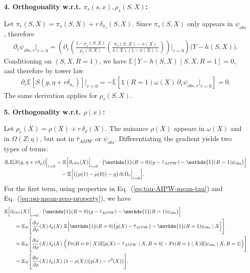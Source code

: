 \documentclass{article}
\theoremstyle{plain}
\theoremstyle{definition}
\theoremstyle{remark}
\newcommand{\E}{\mathbb{E}}                %
\newcommand{\1}{\mathds{1}}                %
\begin{document}
\textbf{4. Orthogonality w.r.t. $\pi_s(s,x), \rho_s(S,X)$:}

Let $\pi_r(S,X)=\pi_s(S,X)+r\,\delta_{\pi_s}(S,X)$. Since $\pi_s(S,X)$ only appears in $\psi_{obs}$, therefore
\begin{align}
\partial_r\psi_{obs,r}\Big|_{r=0}
=\left(\partial_r (\frac{1-\rho_s(S,X)}{\rho_s(S,X)} \left( \frac{\pi_s(S,X) - \pi(X)}{\pi(X)(1-\pi(X))} \right))\Big|_{r=0}\right)\big(Y-h(S,X)\big).
\end{align}
Conditioning on $(S,X,R=1)$, we have $\E[Y-h(S,X)\mid S,X,R=1]=0$, and therefore by tower law
\begin{align}
\partial_r \E[S(g,\eta+r\delta_{\pi_s})]\Big|_{r=0} = -\E\left[\1(R=1)\omega(X)\,\partial_r\psi_{obs,r}\Big|_{r=0}\right]=0.
\end{align}
The same derivation applies for $\rho_s(S,X)$.

\textbf{5. Orthogonality w.r.t. $\rho(x)$:}

Let $\rho_r(X)=\rho(X)+r\,\delta_\rho(X)$. The nuisance $\rho(X)$ appears in $\omega(X)$ and in $\Omega(Z;\eta)$, but not in $\hat\tau_{AIPW}$ or $\psi_{obs}$.
Differentiating the gradient yields two types of terms:
\begin{align}
\partial_r \E[S(g,\eta+r\delta_\rho)]\Big|_{r=0}
&=
\E\Big[\partial_r\omega_r(X)\Big|_{r=0}\cdot\big(\1(R=0)(g-\hat\tau_{AIPW})-\1(R=1)\psi_{obs}\big)\Big] \notag\\
&\quad
-\E\Big[\big((\mu(1)-\mu(0))-g\big)\,\partial_r\Omega_r\Big|_{r=0}\Big].
\label{eq:rho-derivative-decomp}
\end{align}
For the first term, using properties in Eq.~(\ref{eq:tau-AIPW-mean-tau}) and Eq.~(\ref{eq:psi-mean-zero-property}), we have
\begin{align}
&\E\Big[\partial_r\omega_r(X)\Big|_{r=0}\cdot\big(\1(R=0)(g-\hat\tau_{AIPW})-\1(R=1)\psi_{obs}\big)\Big] \notag\\
&\qquad=
\E_X\Bigg[
\frac{\partial\omega}{\partial\rho}(X)\,\delta_\rho(X)\;
\E\Big[\1(R=0)\big(g(X)-\hat\tau_{AIPW}\big)-\1(R=1)\psi_{obs} \mid X\Big]
\Bigg] \notag\\
&\qquad=
\E_X\Bigg[
\frac{\partial\omega}{\partial\rho}(X)\,\delta_\rho(X)\;
\Big(
\Pr(R=0\mid X)\E[g(X)-\hat\tau_{AIPW}\mid X,R=0]
-\Pr(R=1\mid X)\E[\psi_{obs}\mid X,R=1]
\Big)
\Bigg] \notag\\
&\qquad=
\E_X\Bigg[
\frac{\partial\omega}{\partial\rho}(X)\,\delta_\rho(X)\;
(1-\rho(X))\big(g(X)-\tau^0(X)\big)
\Bigg].
\label{eq:rho-first-term}
\end{align}
\end{document}

